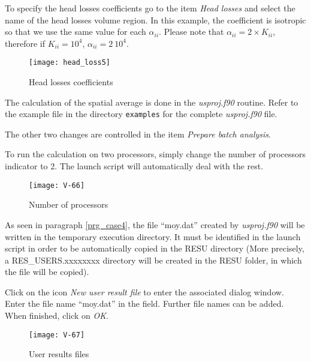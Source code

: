 \newpage
To specify the head losses coefficients go to the item {\itshape Head losses} and select the name of the head losses volume region. In this example, the coefficient is isotropic so that we use the same value for each $\alpha_{ii}$. Please note that $\alpha_{ii}=2 \times K_{ii}$, therefore if $K_{ii}=10^4$, $\alpha_{ii}=2 \ 10^4$.

\begin{figure}[h!]
\begin{center}
\texttt{[image: head\_loss5]}
\caption{Head losses coefficients}
\label{fig_hl2}
\end{center}
\end{figure}

\newpage
The calculation of the spatial average is done in the {\itshape usproj.f90}
routine. Refer to the example file in the
directory \texttt{examples} for the complete {\itshape usproj.f90} file.

The other two changes are controlled in the item
{\itshape Prepare batch analysis}.

To run the calculation on two processors, simply change the number of processors
indicator to 2. The launch script will automatically deal with the rest.

\begin{figure}[h!]
\begin{center}
\texttt{[image: V-66]}
\caption{Number of processors}
\label{fig1_e4}
\end{center}
\end{figure}


\newpage
As seen in paragraph \ref{prg_case4}, the file ``moy.dat'' created by
{\itshape usproj.f90} will be written in the temporary execution directory. It
must be identified in the launch script in order to be automatically copied in
the RESU directory (More precisely, a RES\_USERS.xxxxxxxx directory will be
created in the RESU folder, in which the file will be copied).

Click on the icon {\itshape New user result file} to enter the associated dialog window.
Enter the file name ``moy.dat'' in the field. Further file names can be added. When finished,
click on {\itshape OK}.

\begin{figure}[h!]
\begin{center}
\texttt{[image: V-67]}
\caption{User results files}
\label{fig2_e4}
\end{center}
\end{figure}


